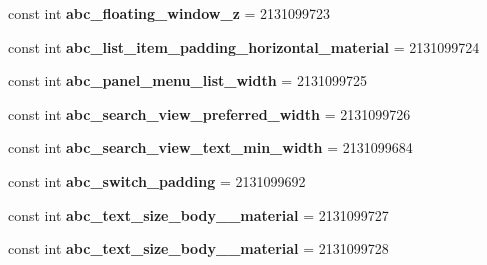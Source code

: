 \begin{DoxyCompactItemize}
\item 
\hypertarget{classClient_1_1Droid_1_1Resource_1_1Dimension_a291720ae9bf1b595df0b97bc3ff4831a}{}const int {\bfseries abc\+\_\+floating\+\_\+window\+\_\+z} = 2131099723\label{classClient_1_1Droid_1_1Resource_1_1Dimension_a291720ae9bf1b595df0b97bc3ff4831a}

\item 
\hypertarget{classClient_1_1Droid_1_1Resource_1_1Dimension_ad9b771f754ba97029f25327faad85abc}{}const int {\bfseries abc\+\_\+list\+\_\+item\+\_\+padding\+\_\+horizontal\+\_\+material} = 2131099724\label{classClient_1_1Droid_1_1Resource_1_1Dimension_ad9b771f754ba97029f25327faad85abc}

\item 
\hypertarget{classClient_1_1Droid_1_1Resource_1_1Dimension_ad3df6f4806f74dd1849c1ba8651e415f}{}const int {\bfseries abc\+\_\+panel\+\_\+menu\+\_\+list\+\_\+width} = 2131099725\label{classClient_1_1Droid_1_1Resource_1_1Dimension_ad3df6f4806f74dd1849c1ba8651e415f}

\item 
\hypertarget{classClient_1_1Droid_1_1Resource_1_1Dimension_aa82a7a8c05fb6542e1c67933066781be}{}const int {\bfseries abc\+\_\+search\+\_\+view\+\_\+preferred\+\_\+width} = 2131099726\label{classClient_1_1Droid_1_1Resource_1_1Dimension_aa82a7a8c05fb6542e1c67933066781be}

\item 
\hypertarget{classClient_1_1Droid_1_1Resource_1_1Dimension_a5cf879257fbb0536af2e7afcca42a9ae}{}const int {\bfseries abc\+\_\+search\+\_\+view\+\_\+text\+\_\+min\+\_\+width} = 2131099684\label{classClient_1_1Droid_1_1Resource_1_1Dimension_a5cf879257fbb0536af2e7afcca42a9ae}

\item 
\hypertarget{classClient_1_1Droid_1_1Resource_1_1Dimension_ad1f938a5665168c31a75c248e8d4a489}{}const int {\bfseries abc\+\_\+switch\+\_\+padding} = 2131099692\label{classClient_1_1Droid_1_1Resource_1_1Dimension_ad1f938a5665168c31a75c248e8d4a489}

\item 
\hypertarget{classClient_1_1Droid_1_1Resource_1_1Dimension_ab9444dc78b11db1fdfecac3f4d9bb902}{}const int {\bfseries abc\+\_\+text\+\_\+size\+\_\+body\+\_\+\_\+material} = 2131099727\label{classClient_1_1Droid_1_1Resource_1_1Dimension_ab9444dc78b11db1fdfecac3f4d9bb902}

\item 
\hypertarget{classClient_1_1Droid_1_1Resource_1_1Dimension_a78137214f45923f23c2cec4c96d6c2c5}{}const int {\bfseries abc\+\_\+text\+\_\+size\+\_\+body\+\_\+\_\+material} = 2131099728\label{classClient_1_1Droid_1_1Resource_1_1Dimension_a78137214f45923f23c2cec4c96d6c2c5}


\end{DoxyCompactItemize}
